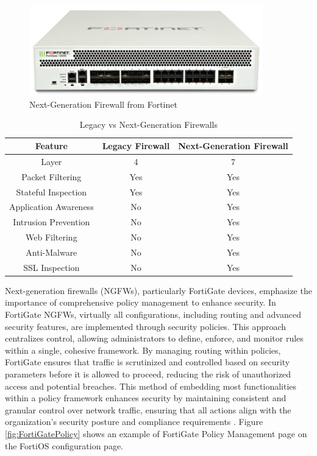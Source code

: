 \documentclass[12pt]{report}
\begin{document}
\begin{figure}[h]
    \centering
    \includegraphics[width=0.9\textwidth]{images/FortiGate.png}
    \caption{Next-Generation Firewall from Fortinet \cite{FNFWIMG}}
    \label{fig:NGFW}
\end{figure}


\begin{table}[h]
    \centering
    \begin{tabular}{|c|c|c|}
    \hline
    \textbf{Feature} & \textbf{Legacy Firewall} & \textbf{Next-Generation Firewall} \\ \hline
    Layer & 4 & 7 \\ \hline
    Packet Filtering & Yes & Yes \\ \hline
    Stateful Inspection & Yes & Yes \\ \hline
    Application Awareness & No & Yes \\ \hline
    Intrusion Prevention & No & Yes \\ \hline
    Web Filtering & No & Yes \\ \hline
    Anti-Malware & No & Yes \\ \hline
    SSL Inspection & No & Yes \\ \hline
    \end{tabular}
    \caption{Legacy vs Next-Generation Firewalls}
    \label{tab:firewalls}
\end{table}
Next-generation firewalls (NGFWs), particularly FortiGate devices, emphasize the importance of comprehensive policy management to enhance security. In FortiGate NGFWs, virtually all configurations, including routing and advanced security features, are implemented through security policies. This approach centralizes control, allowing administrators to define, enforce, and monitor rules within a single, cohesive framework. By managing routing within policies, FortiGate ensures that traffic is scrutinized and controlled based on security parameters before it is allowed to proceed, reducing the risk of unauthorized access and potential breaches. This method of embedding most functionalities within a policy framework enhances security by maintaining consistent and granular control over network traffic, ensuring that all actions align with the organization's security posture and compliance requirements \cite{Policies}. Figure \ref{fig:FortiGatePolicy} shows an example of FortiGate Policy Management page on the FortiOS configuration page.
\end{document}
